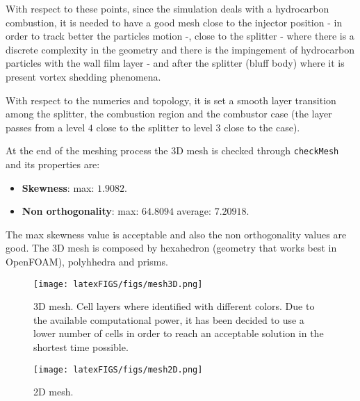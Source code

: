 With respect to these points, since the simulation deals with a hydrocarbon combustion, it is needed to have a good mesh close to the injector position - in order to track better the particles motion -, close to the splitter - where there is a discrete complexity in the geometry and there is the impingement of hydrocarbon particles with the wall film layer - and after the splitter (bluff body) where it is present vortex shedding phenomena. 

With respect to the numerics and topology, it is set a smooth layer transition among the splitter, the combustion region and the combustor case (the layer passes from a level $4$ close to the splitter to level $3$ close to the case). 

At the end of the meshing process the 3D mesh is checked through \verb|checkMesh| and its properties are:
\begin{itemize}
    \item \textbf{Skewness}: max: $1.9082$.
    \item \textbf{Non orthogonality}: max: $64.8094$ average: $7.20918$.
\end{itemize}

The max skewness value is acceptable and also the non orthogonality values are good. The 3D mesh is composed by hexahedron (geometry that works best in OpenFOAM), polyhhedra and prisms. 

\newpage

\addtocounter{lastPage}{\thepage}
\setcounter{page}{1}
\renewcommand{\thepage}{MSH-\roman{page}}

\begin{figure}[!h]
  \texttt{[image: latexFIGS/figs/mesh3D.png]}
    \caption[3D mesh.]{3D mesh. Cell layers where identified with different colors. Due to the available computational power, it has been decided to use a lower number of cells in order to reach an acceptable solution in the shortest time possible.} 
  \label{fig:mesh3D}
\end{figure}

\begin{figure}[!h]
    \texttt{[image: latexFIGS/figs/mesh2D.png]}
    \caption{2D mesh.}
    \label{fig:mesh2D}
\end{figure}
